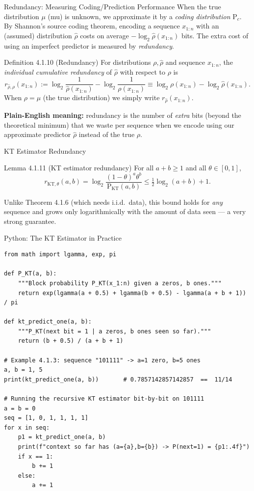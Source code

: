 \documentclass[aspectratio=169,10pt]{beamer}
\newcommand{\PKT}{\mathrm{P}_{\mathrm{KT}}}
\begin{document}
\begin{frame}{Redundancy: Measuring Coding/Prediction Performance}
When the true distribution $\mu$ (mu) is unknown, we approximate it by a \emph{coding
distribution} $\mathrm{P}_c$. By Shannon's source coding theorem, encoding a sequence
$x_{1:n}$ with an (assumed) distribution $\hat\rho$ costs on average
$-\log_2\hat\rho(x_{1:n})$ bits. The extra cost of using an imperfect predictor is measured
by \emph{redundancy}.

\begin{block}{Definition 4.1.10 (Redundancy)}
For distributions $\rho,\hat\rho$ and sequence $x_{1:n}$, the \emph{individual cumulative
redundancy} of $\hat\rho$ with respect to $\rho$ is
$$
r_{\hat\rho,\rho}(x_{1:n}) := \log_2\frac{1}{\hat\rho(x_{1:n})} - \log_2\frac{1}{\rho(x_{1:n})}
\equiv \log_2\rho(x_{1:n}) - \log_2\hat\rho(x_{1:n}).
$$
When $\rho=\mu$ (the true distribution) we simply write $r_{\hat\rho}(x_{1:n})$.
\end{block}
\textbf{Plain-English meaning:} redundancy is the number of \emph{extra} bits (beyond the
theoretical minimum) that we waste per sequence when we encode using our approximate
predictor $\hat\rho$ instead of the true $\rho$.
\end{frame}

\begin{frame}{KT Estimator Redundancy}
\begin{block}{Lemma 4.1.11 (KT estimator redundancy)}
For all $a+b\ge 1$ and all $\theta\in[0,1]$,
$$
r_{\mathrm{KT},\theta}(a,b) = \log_2\frac{(1-\theta)^a\theta^b}{\PKT(a,b)} \le
\tfrac12\log_2(a+b)+1.
$$
\end{block}
Unlike Theorem 4.1.6 (which needs i.i.d.\ data), this bound holds for \emph{any} sequence
and grows only logarithmically with the amount of data seen --- a very strong guarantee.
\end{frame}

\begin{frame}[fragile]{Python: The KT Estimator in Practice}
\begin{lstlisting}
from math import lgamma, exp, pi

def P_KT(a, b):
    """Block probability P_KT(x_1:n) given a zeros, b ones."""
    return exp(lgamma(a + 0.5) + lgamma(b + 0.5) - lgamma(a + b + 1)) / pi

def kt_predict_one(a, b):
    """P_KT(next bit = 1 | a zeros, b ones seen so far)."""
    return (b + 0.5) / (a + b + 1)

# Example 4.1.3: sequence "101111" -> a=1 zero, b=5 ones
a, b = 1, 5
print(kt_predict_one(a, b))       # 0.7857142857142857  ==  11/14

# Running the recursive KT estimator bit-by-bit on 101111
a = b = 0
seq = [1, 0, 1, 1, 1, 1]
for x in seq:
    p1 = kt_predict_one(a, b)
    print(f"context so far has (a={a},b={b}) -> P(next=1) = {p1:.4f}")
    if x == 1:
        b += 1
    else:
        a += 1
\end{lstlisting}
\end{frame}
\end{document}
